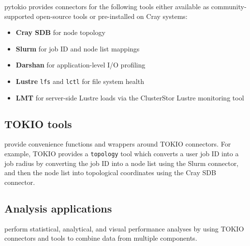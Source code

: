 pytokio provides connectors for the following tools either available as community-supported open-source tools or pre-installed on Cray systems:

\begin{itemize}
\item \textbf{Cray SDB} for node topology
\item \textbf{Slurm} for job ID and node list mappings
\item \textbf{Darshan} for application-level I/O profiling
\item \textbf{Lustre} \texttt{lfs} and \texttt{lctl} for file system health
\item \textbf{LMT} for server-side Lustre loads via the ClusterStor Lustre monitoring tool~\cite{Keopp2014}
\end{itemize}

\subsection{TOKIO tools} \label{sec:architecture/tools}

provide convenience functions and wrappers around TOKIO connectors.  For example, TOKIO provides a \texttt{topology} tool which converts a user job ID into a job radius by converting the job ID into a node list using the Slurm connector, and then the node list into topological coordinates using the Cray SDB connector.

\subsection{Analysis applications} \label{sec:architecture/analysis}

perform statistical, analytical, and visual performance analyses by using TOKIO connectors and tools to combine data from multiple components.